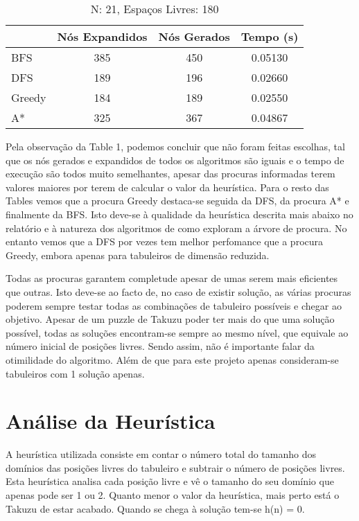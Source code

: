 \documentclass[12pt,a4paper]{article}
\begin{document}
  \begin{table}[H]
    \caption{N: 21, Espaços Livres: 180}
    \label{tab:my-table3}
    \centering
    \begin{tabular}{lccc}
      & Nós Expandidos & Nós Gerados & Tempo (s) \\
      \hline
      BFS    & 385 & 450 & 0.05130 \\
      DFS    & 189 & 196 & 0.02660 \\
      Greedy & 184 & 189 & 0.02550 \\
      A*     & 325 & 367 & 0.04867 \\
    \hline
    \end{tabular}
  \end{table}

  Pela observação da Table 1, podemos concluir que não foram feitas escolhas, tal que os nós gerados e expandidos de todos os algoritmos são iguais e o tempo de execução são todos muito semelhantes, apesar das procuras informadas terem valores maiores por terem de calcular o valor da heurística.
  Para o resto das Tables vemos que a procura Greedy destaca-se seguida da DFS, da procura A* e finalmente da BFS.
  Isto deve-se à qualidade da heurística descrita mais abaixo no relatório e à natureza dos algoritmos de como exploram a árvore de procura.
  No entanto vemos que a DFS por vezes tem melhor perfomance que a procura Greedy, embora apenas para tabuleiros de dimensão reduzida. 
  
  Todas as procuras garantem completude apesar de umas serem mais eficientes que outras. Isto deve-se ao facto de, no caso de existir solução, as várias procuras poderem sempre testar todas as combinações de tabuleiro possíveis e chegar ao objetivo.
  Apesar de um puzzle de Takuzu poder ter mais do que uma solução possível, todas as soluções encontram-se sempre ao mesmo nível, que equivale ao número inicial de posições livres. Sendo assim, não é importante falar da otimilidade do algoritmo.
  Além de que para este projeto apenas consideram-se tabuleiros com 1 solução apenas.
  
  \section{Análise da Heurística}

  A heurística utilizada consiste em contar o número total do tamanho dos domínios das posições livres do tabuleiro e subtrair o número de posições livres.
  Esta heurística analisa cada posição livre e vê o tamanho do seu domínio que apenas pode ser 1 ou 2.
  Quanto menor o valor da heurística, mais perto está o Takuzu de estar acabado.
  Quando se chega à solução tem-se h(n) = 0.
  
\end{document}
